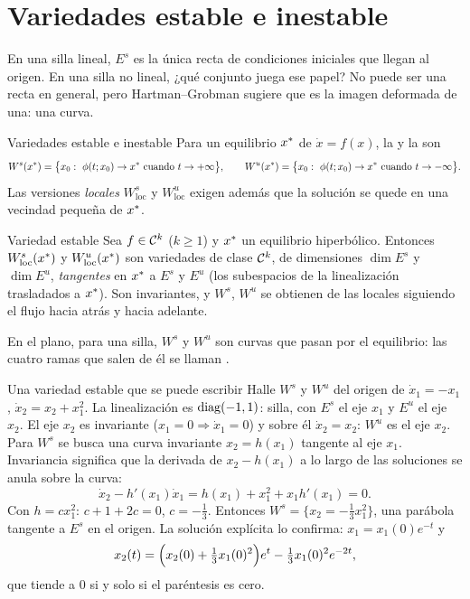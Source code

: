 \section{Variedades estable e inestable}
\label{sec:bi-variedades}

En una silla lineal, $E^s$ es la única recta de condiciones iniciales que llegan al origen. En una silla no lineal, ¿qué conjunto juega ese papel? No puede ser una recta en general, pero Hartman--Grobman sugiere que es la imagen deformada de una: una curva.

\begin{definicion}[label=def:bi-variedades]{Variedades estable e inestable}
Para un equilibrio $x^{*}$ de $\dot x=f(x)$, la  y la  son
\[
  W^s(\eq)=\bigl\{x_0:\ \flujo t{x_0}\to\eq\ \text{cuando}\ t\to+\infty\bigr\},\qquad
  W^u(\eq)=\bigl\{x_0:\ \flujo t{x_0}\to\eq\ \text{cuando}\ t\to-\infty\bigr\}.
\]
Las versiones \emph{locales} $W^s_{\mathrm{loc}}$ y $W^u_{\mathrm{loc}}$ exigen además que la solución se quede en una vecindad pequeña de $x^{*}$.
\end{definicion}

\begin{teorema}[label=thm:bi-variedadestable]{Variedad estable \citep[\S2.7]{Per01}}
Sea $f\in\mathcal{C}^{k}$ ($k\ge1$) y $x^{*}$ un equilibrio hiperbólico. Entonces $W^s_{\mathrm{loc}}(x^{*})$ y $W^u_{\mathrm{loc}}(x^{*})$ son variedades de clase $\mathcal{C}^{k}$, de dimensiones $\dim E^s$ y $\dim E^u$, \emph{tangentes} en $x^{*}$ a $E^s$ y $E^u$ (los subespacios de la linealización trasladados a $x^{*}$). Son invariantes, y $W^s$, $W^u$ se obtienen de las locales siguiendo el flujo hacia atrás y hacia adelante.
\end{teorema}

En el plano, para una silla, $W^s$ y $W^u$ son curvas que pasan por el equilibrio: las cuatro ramas que salen de él se llaman .

\begin{ejemplo}[label=ej:bi-variedad]{Una variedad estable que se puede escribir}
Halle $W^s$ y $W^u$ del origen de $\dot x_1=-x_1$, $\dot x_2=x_2+x_1^2$.
\solucion La linealización es $\operatorname{diag}(-1,1)$: silla, con $E^s$ el eje $x_1$ y $E^u$ el eje $x_2$. El eje $x_2$ es invariante ($x_1=0\Rightarrow\dot x_1=0$) y sobre él $\dot x_2=x_2$: $W^u$ es el eje $x_2$. Para $W^s$ se busca una curva invariante $x_2=h(x_1)$ tangente al eje $x_1$. Invariancia significa que la derivada de $x_2-h(x_1)$ a lo largo de las soluciones se anula sobre la curva:
\[
  \dot x_2-h'(x_1)\dot x_1=h(x_1)+x_1^2+x_1h'(x_1)=0 .
\]
Con $h=cx_1^2$: $c+1+2c=0$, $c=-\tfrac13$. Entonces $W^s=\{x_2=-\tfrac13x_1^2\}$, una parábola tangente a $E^s$ en el origen. La solución explícita lo confirma: $x_1=x_1(0)e^{-t}$ y
\[
  x_2(t)=\Bigl(x_2(0)+\tfrac13x_1(0)^2\Bigr)e^{t}-\tfrac13x_1(0)^2e^{-2t},
\]
que tiende a $0$ si y solo si el paréntesis es cero.
\end{ejemplo}

